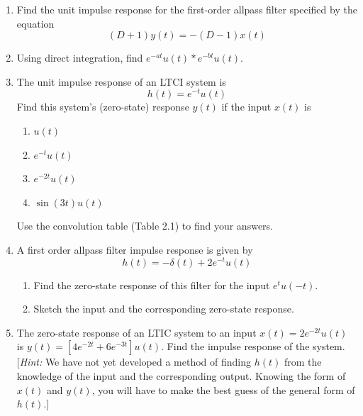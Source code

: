 \documentclass{article}
\begin{document}
\begin{enumerate}[label=\textbf{\thesubsubsection}]
\begin{enumerate}[label=(\alph*)]
					\vfill
			\end{enumerate}
			\newpage
			\setcounter{subsubsection}{4}
		\item Find the unit impulse response for the first-order allpass filter specified by the equation
			\[
				(D+1)y(t) = -(D-1)x(t)
			\]
			\newpage
			\setcounter{subsection}{4}
			\setcounter{subsubsection}{13}
		\item Using direct integration, find \(e^{-at}u(t)*e^{-bt}u(t)\).
			\newpage
			\setcounter{subsection}{4}
			\setcounter{subsubsection}{16}
		\item The unit impulse response of an LTCI system is
			\[
				h(t) = e^{-t}u(t)
			\]
			Find this system's (zero-state) response \(y(t)\) if the input \(x(t)\) is
			\begin{enumerate}[label=\alph*)]
				\item \(u(t)\)
					\vfill
				\item \(e^{-t}u(t)\)
					\vfill
				\item \(e^{-2t}u(t)\)
					\vfill
				\item \(\sin{(3t)}u(t)\)
					\vfill
			\end{enumerate}
				Use the convolution table (Table 2.1) to find your answers.
				\newpage
				\setcounter{subsubsection}{21}
			\item A first order allpass filter impulse response is given by
				\[
					h(t) = -\delta(t) + 2e^{-t}u(t)
				\]
				\begin{enumerate}[label=\alph*)]
					\item Find the zero-state response of this filter for the input \(e^{t}u(-t)\).
						\vfill
					\item Sketch the input and the corresponding zero-state response.
						\vfill
				\end{enumerate}
				\setcounter{subsubsection}{23}
				\newpage
			\item The zero-state response of an LTIC system to an input \(x(t) = 2e^{-2t}u(t)\) is \(y(t) = [4e^{-2t} + 6e^{-3t}]u(t)\). Find the impulse response of the system. [\textit{Hint:} We have not yet developed a method of finding \(h(t)\) from the knowledge of the input and the corresponding output. Knowing the form of \(x(t)\) and \(y(t)\), you will have to make the best guess of the general form of \(h(t)\).]
\end{enumerate}
\end{document}
